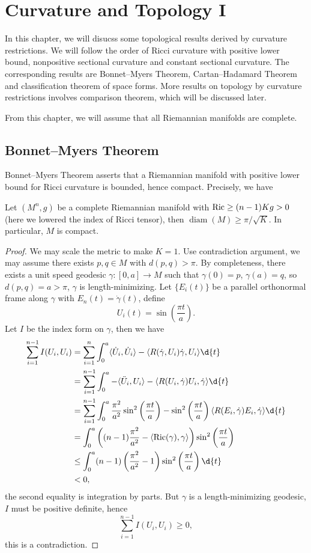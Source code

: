 \chapter{Curvature and Topology I}
In this chapter, we will disucss some topological results derived by curvature restrictions.
We will follow the order of Ricci curvature with positive lower bound, nonpositive sectional curvature and constant sectional curvature.
The corresponding results are Bonnet--Myers Theorem, Cartan--Hadamard Theorem and classification theorem of space forms.
More results on topology by curvature restrictions involves comparison theorem, which will be discussed later.

From this chapter, we will assume that all Riemannian manifolds are complete.

\section{Bonnet--Myers Theorem}

Bonnet--Myers Theorem asserts that a Riemannian manifold with positive lower bound for Ricci curvature is bounded, hence compact.
Precisely, we have
\begin{thm}
    Let $(M^n,g)$ be a complete Riemannian manifold with $\operatorname{Ric}\geq(n-1)Kg>0$ (here we lowered the index of Ricci tensor), then $\operatorname{diam}(M)\geq\pi/\sqrt{K}$.
    In particular, $M$ is compact.
\end{thm}
\begin{proof}
    We may scale the metric to make $K=1$.
    Use contradiction argument, we may assume there exists $p,q\in M$ with $d(p,q)>\pi$.
    By completeness, there exists a unit speed geodesic $\gamma:[0,a]\to M$ such that $\gamma(0)=p$, $\gamma(a)=q$, so $d(p,q)=a>\pi$, $\gamma$ is length-minimizing.
    Let $\{E_i(t)\}$ be a parallel orthonormal frame along $\gamma$ with $E_n(t)=\dot\gamma(t)$, define
    \[U_i(t)=\sin\left(\frac{\pi t}{a}\right).\]
    Let $I$ be the index form on $\gamma$, then we have
    \begin{align*}
        \sum_{i=1}^{n-1}I(U_i,U_i)&=\sum_{i=1}^n\int_0^a\langle\dot U_i,\dot U_i\rangle-\langle R(\dot\gamma,U_i)\dot\gamma,U_i\rangle\d{t}\\
        &=\sum_{i=1}^{n-1}\int_0^a-\langle\ddot{U}_i,U_i\rangle-\langle R(U_i,\dot\gamma)U_i,\dot\gamma\rangle\d{t}\\
        &=\sum_{i=1}^{n-1}\int_0^a\frac{\pi^2}{a^2}\sin^2\left(\frac{\pi t}{a}\right)-\sin^2\left(\frac{\pi t}{a}\right)\langle R(E_i,\dot\gamma)E_i,\dot\gamma\rangle\d{t}\\
        &=\int_0^a\left((n-1)\frac{\pi^2}{a^2}-\langle\Ric(\gamma),\gamma\rangle\right)\sin^2\left(\frac{\pi t}{a}\right)\\
        &\leq\int_0^a(n-1)\left(\frac{\pi^2}{a^2}-1\right)\sin^2\left(\frac{\pi t}{a}\right)\d{t}\\
        &<0,
    \end{align*}
    the second equality is integration by parts.
    But $\gamma$ is a length-minimizing geo\-desic, $I$ must be positive definite, hence
    \[\sum_{i=1}^{n-1}I(U_i,U_i)\geq 0,\]
    this is a contradiction.
\end{proof}

